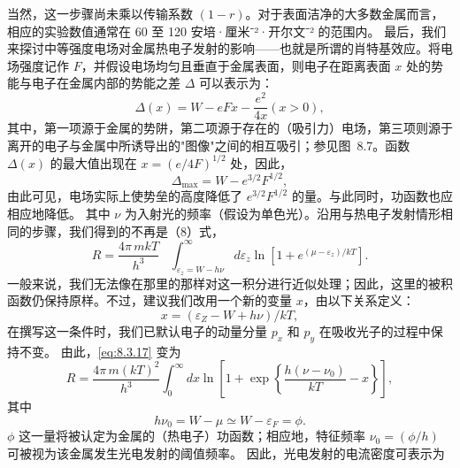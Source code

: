 当然，这一步骤尚未乘以传输系数 \((1-r)\)。对于表面洁净的大多数金属而言，相应的实验数值通常在 60 至 120 安培·厘米⁻²·开尔文⁻² 的范围内。
最后，我们来探讨中等强度电场对金属热电子发射的影响——也就是所谓的肖特基效应。将电场强度记作 \(F\)，并假设电场均匀且垂直于金属表面，则电子在距离表面 \(x\) 处的势能与电子在金属内部的势能之差 \(\Delta\) 可以表示为：
\begin{equation}\tag{8.3.15}\label{eq:8.3.15}
\Delta ( x ) = W - e F x - { \frac { e ^{2} } { 4 x } }  ( x > 0 ) ,
\end{equation}
其中，第一项源于金属的势阱，第二项源于存在的（吸引力）电场，第三项则源于离开的电子与金属中所诱导出的"图像"之间的相互吸引；参见图~8.7。函数 \(\Delta(x)\) 的最大值出现在 \(x=(e/4F)^{1/2}\) 处，因此，
\begin{equation}\tag{8.3.16}\label{eq:8.3.16}
\Delta _ { \mathrm { m a x } } = W - e ^{3 / 2} F ^{1 / 2} ,
\end{equation}
由此可见，电场实际上使势垒的高度降低了 \(e^{3/2}F^{1/2}\) 的量。与此同时，功函数也应相应地降低。
其中 \(\nu\) 为入射光的频率（假设为单色光）。沿用与热电子发射情形相同的步骤，我们得到的不再是（8）式，
\begin{equation}\tag{8.3.17}\label{eq:8.3.17}
R = \frac { 4 \pi \, m k T } { h ^{3} } \, \, \, \, \, \int _ { \varepsilon _ { z } = W - h \nu } ^{\infty} d \varepsilon _ { z } \ln [ 1 + e ^{( \mu - \varepsilon _ { z} ) / k T } ] .
\end{equation}
一般来说，我们无法像在那里的那样对这一积分进行近似处理；因此，这里的被积函数仍保持原样。不过，建议我们改用一个新的变量 \(x\)，由以下关系定义：
\begin{equation}\tag{8.3.18}\label{eq:8.3.18}
x = ( \varepsilon _ { Z } - W + h \nu ) / k T ,
\end{equation}
在撰写这一条件时，我们已默认电子的动量分量 \(p_{x}\) 和 \(p_{y}\) 在吸收光子的过程中保持不变。
由此，\autoref{eq:8.3.17} 变为
\begin{equation}\tag{8.3.19}\label{eq:8.3.19}
R = \frac { 4 \pi \, m ( k T ) ^{2} } { h ^{3} } \int _ { 0 } ^{\infty} d x \ln \left[ 1 + \exp \left\{ \frac { h ( \nu - \nu _ { 0 } ) } { k T } - x \right\} \right] ,
\end{equation}
其中
\begin{equation}\tag{8.3.20}\label{eq:8.3.20}
h \nu _ { 0 } = W - \mu \simeq W - \varepsilon _ { F } = \phi .
\end{equation}
\(\phi\) 这一量将被认定为金属的（热电子）功函数；相应地，特征频率 \(\nu_{0} = (\phi/h)\) 可被视为该金属发生光电发射的阈值频率。
因此，光电发射的电流密度可表示为
